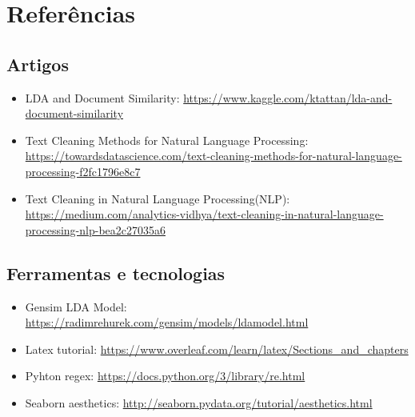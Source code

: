 \section{Referências}

\subsection{Artigos}

\begin{itemize}
    \item LDA and Document Similarity: \url{https://www.kaggle.com/ktattan/lda-and-document-similarity}
    \item Text Cleaning Methods for Natural Language Processing: \url{https://towardsdatascience.com/text-cleaning-methods-for-natural-language-processing-f2fc1796e8c7}
    \item Text Cleaning in Natural Language Processing(NLP): \url{https://medium.com/analytics-vidhya/text-cleaning-in-natural-language-processing-nlp-bea2c27035a6}
\end{itemize}

\subsection{Ferramentas e tecnologias}

\begin{itemize}
    \item Gensim LDA Model: \url{https://radimrehurek.com/gensim/models/ldamodel.html}
    \item Latex tutorial: \url{https://www.overleaf.com/learn/latex/Sections\_and\_chapters}
    \item Pyhton regex: \url{https://docs.python.org/3/library/re.html}
    \item Seaborn aesthetics: \url{http://seaborn.pydata.org/tutorial/aesthetics.html}
\end{itemize}